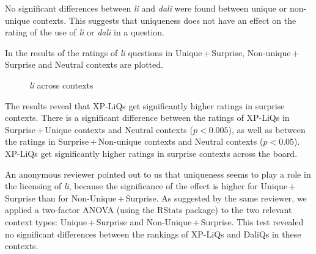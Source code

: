\documentclass[output=paper]{langscibook}
\begin{document}
No significant differences between \textit{li} and \textit{dali} were found between unique or non-unique contexts. This suggests that uniqueness does not have an effect on the rating of the use of \textit{li} or \textit{dali} in a question.

In  the results of the ratings of \textit{li} questions in Unique\,+\,Surprise, Non-unique\,+\,Surprise and Neutral contexts are plotted.


\begin{figure}
    \caption{\textit{li} across contexts}
    \label{lipic}
\end{figure}

The results reveal that XP-LiQs get significantly higher ratings in surprise contexts. There is a significant difference between the ratings of XP-LiQs in Surprise\,+\,Unique contexts and Neutral contexts ($p<0.005$), as well as between the ratings in Surprise\,+\,Non-unique contexts and Neutral contexts ($p<0.05$). XP-LiQs get significantly higher ratings in surprise contexts across the board.

An anonymous reviewer pointed out to us that uniqueness seems to play a role in the licensing of \textit{li}, because the significance of the effect is higher for Unique\,+\,Surprise than for
Non-Unique\,+\,Surprise. As suggested by the same reviewer, we applied a two-factor ANOVA (using the RStats package) to the two relevant context types: Unique\,+\,Surprise and Non-Unique\,+\,Surprise. This test revealed no significant differences between the rankings of XP-LiQs and DaliQs in these contexts.
\end{document}
